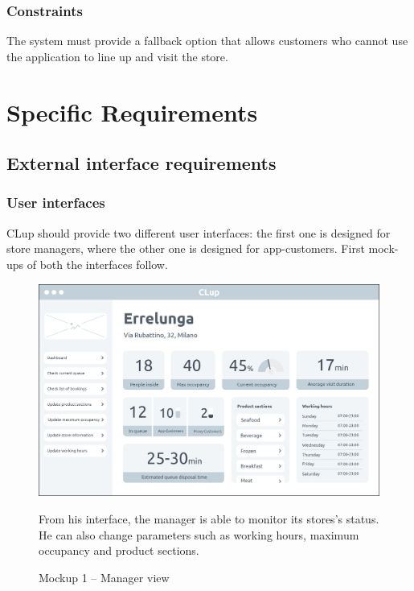 \documentclass[a4paper,oneside,11pt]{book}   %
\begin{document}
    \subsection{Constraints} 
    The system must provide a fallback option that allows customers who cannot use the application to line up and visit the store.
    
    
\chapter{Specific Requirements}
    \section{External interface requirements}
    \subsection{User interfaces}
    CLup should provide two different user interfaces: the first one is designed for store managers, where the other one is designed for app-customers. First mock-ups of both the interfaces follow.
    
    \begin{figure}[H]
        \centering
        \includegraphics[width=.97\textwidth, height=\textheight, keepaspectratio]{pictures/mockups/manager_view}
        \caption{Mockup 1 -- Manager view}{From his interface, the manager is able to monitor its stores's status. He can also change parameters such as working hours, maximum occupancy and product sections.}
        \label{figure:mockup_1_manager}
    \end{figure}
    
\end{document}
